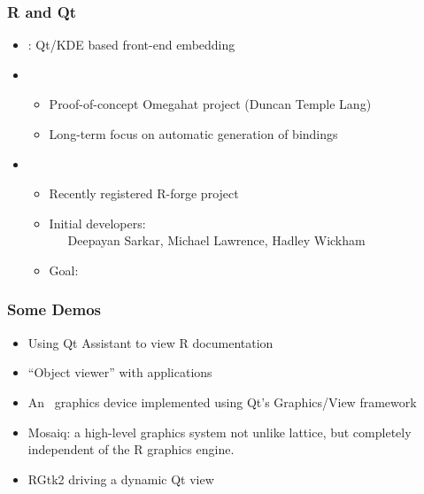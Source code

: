 \documentclass[compress]{beamer}
\begin{document}





\begin{frame}
  \frametitle{R and Qt}
  \begin{itemize}
  \item {}: Qt/KDE based front-end embedding \R
  \item {}
    \begin{itemize}
    \item Proof-of-concept Omegahat project (Duncan Temple Lang)
    \item Long-term focus on automatic generation of bindings
      \end{itemize}
    \item {}
      \begin{itemize}
      \item Recently registered R-forge project
      \item Initial developers: \\
        ~~~Deepayan Sarkar, Michael Lawrence, Hadley Wickham
      \item Goal:\\
      \end{itemize}
    \end{itemize}
\end{frame}


\begin{frame}
  \frametitle{Some Demos}
  \begin{itemize}
  \item Using Qt Assistant to view R documentation
  \item ``Object viewer'' with applications
  \item An \R\ graphics device implemented using Qt's Graphics/View framework
  \item Mosaiq: a high-level graphics system not unlike lattice, but
    completely independent of the R graphics engine.
  \item RGtk2 driving a dynamic Qt view 
  \end{itemize}
\end{frame}
\end{document}
